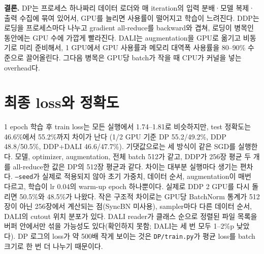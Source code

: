 \documentclass[11pt,a4paper]{article}
\begin{document}
\textbf{결론.} DP는 프로세스 하나짜리 데이터 로더와 매 iteration의 입력 분배·모델 복제·출력 수집에 묶여 있어서, GPU를 늘리면 사용률이 떨어지고
학습이 느려진다. DDP는 로딩을 프로세스마다 나누고 gradient all-reduce를 backward와 겹쳐, 로딩이 병목인 동안에는 GPU 수에 가깝게 빨라진다.
DALI는 augmentation을 GPU로 옮기고 비동기로 미리 준비해서, 1 GPU에서 GPU 사용률과 메모리 대역폭 사용률을 80--90\% 수준으로 끌어올린다.
그다음 병목은 GPU당 batch가 작을 때 CPU가 커널을 넣는 overhead다.

\section{최종 loss와 정확도}

1 epoch 학습 후 train loss는 모든 실행에서 1.74--1.81로 비슷하지만, test 정확도는 46.6\%에서 55.2\%까지 차이가 난다
(1/2 GPU 기준 DP 55.2/49.2\%, DDP 48.8/50.5\%, DDP+DALI 46.6/47.7\%). 기댓값으로는 세 방식이 같은 SGD를 실행한다.
모델, optimizer, augmentation, 전체 batch 512가 같고, DDP가 256장 평균 두 개를 all-reduce한 값은 DP의 512장 평균과 같다.
차이는 대부분 실행마다 생기는 편차다. \texttt{--seed}가 실제로 적용되지 않아 초기 가중치, 데이터 순서, augmentation이 매번 다르고,
학습이 lr 0.04의 warm-up epoch 하나뿐이다. 실제로 DDP 2 GPU를 다시 돌리면 50.5\%와 48.5\%가 나왔다. 작은 구조적 차이로는
GPU당 BatchNorm 통계가 512장이 아닌 256장에서 계산되는 점(SyncBN 미사용), sampler마다 다른 데이터 순서, DALI의 cutout 위치 분포가 있다.
DALI reader가 클래스 순으로 정렬된 파일 목록을 버퍼 안에서만 섞을 가능성도 있다(확인하지 못함; DALI는 세 번 모두 1--2\%p 낮았다).
DP 로그의 loss가 약 500배 작게 보이는 것은 \texttt{DP/train.py}가 평균 loss를 batch 크기로 한 번 더 나누기 때문이다.
\end{document}
